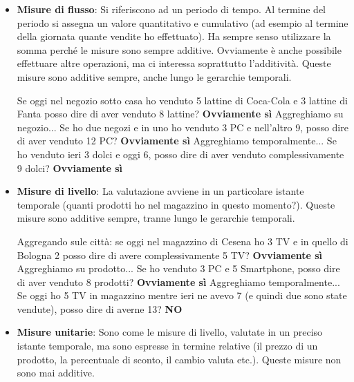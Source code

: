 \begin{itemize}
	\item \textbf{Misure di flusso}: Si riferiscono ad un periodo di tempo. Al termine del periodo si assegna un valore quantitativo e cumulativo (ad esempio al termine della giornata quante vendite ho effettuato). Ha sempre senso utilizzare la somma perché le misure sono sempre additive. Ovviamente è anche possibile effettuare altre operazioni, ma ci interessa soprattutto l'additività.\newline
	Queste misure sono additive sempre, anche lungo le gerarchie temporali.
	\begin{info}[Esempio:]
		\newline Se oggi nel negozio sotto casa ho venduto 5 lattine di Coca-Cola e 3 lattine di Fanta posso dire di aver venduto 8 lattine? \textbf{Ovviamente sì}\newline
		Aggreghiamo su negozio... Se ho due negozi e in uno ho venduto 3 PC e nell'altro 9, posso dire di aver venduto 12 PC? \textbf{Ovviamente sì}\newline
		Aggreghiamo temporalmente... Se ho venduto ieri 3 dolci e oggi 6, posso dire di aver venduto complessivamente 9 dolci? \textbf{Ovviamente sì}\newline
	\end{info}
	\item \textbf{Misure di livello}: La valutazione avviene in un particolare istante temporale (quanti prodotti ho nel magazzino in questo momento?). Queste misure sono additive sempre, tranne lungo le gerarchie temporali.
	\begin{info}[Esempio:]
		\newline Aggregando sule città: se oggi nel magazzino di Cesena ho 3 TV e in quello di Bologna 2 posso dire di avere complessivamente 5 TV? \textbf{Ovviamente sì}\newline
		Aggreghiamo su prodotto... Se ho venduto 3 PC e 5 Smartphone, posso dire di aver venduto 8 prodotti? \textbf{Ovviamente sì}\newline
		Aggreghiamo temporalmente... Se oggi ho 5 TV in magazzino mentre ieri ne avevo 7 (e quindi due sono state vendute), posso dire di averne 13? \textbf{NO}\newline
	\end{info}
	\item \textbf{Misure unitarie}: Sono come le misure di livello, valutate in un preciso istante temporale, ma sono espresse in termine relative (il prezzo di un prodotto, la percentuale di sconto, il cambio valuta etc.). Queste misure non sono mai additive.

\end{itemize}
